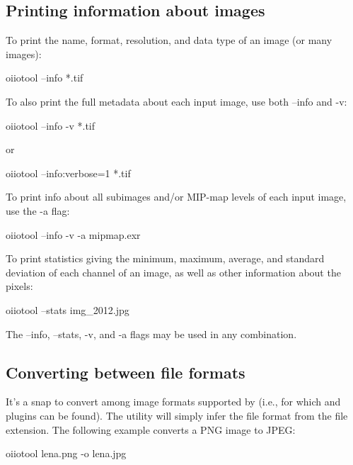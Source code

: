\subsection*{Printing information about images}

To print the name, format, resolution, and data type of an image
(or many images):

\begin{code}
    oiiotool --info *.tif
\end{code}

\noindent To also print the full metadata about each input image, use both
{\cf --info} and {\cf -v}:

\begin{code}
    oiiotool --info -v *.tif
\end{code}

\noindent or

\begin{code}
    oiiotool --info:verbose=1 *.tif
\end{code}

\noindent To print info about all subimages and/or MIP-map levels of each
input image, use the {\cf -a} flag:

\begin{code}
    oiiotool --info -v -a mipmap.exr
\end{code}

\noindent To print statistics giving the minimum, maximum, average, and
standard deviation of each channel of an image, as well as other
information about the pixels:

\begin{code}
    oiiotool --stats img_2012.jpg
\end{code}

\noindent The {\cf --info}, {\cf --stats}, {\cf -v}, and {\cf -a} flags may
be used in any combination.


\subsection*{Converting between file formats}

It's a snap to convert among image formats supported by \product
(i.e., for which \ImageInput and \ImageOutput plugins can be found).
The \oiiotool utility will simply infer the file format from the
file extension. The following example converts a PNG image to JPEG:

\begin{code}
    oiiotool lena.png -o lena.jpg
\end{code}


